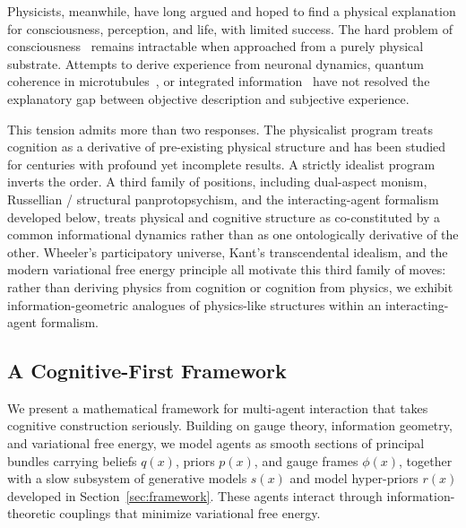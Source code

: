 \documentclass[11pt]{article}
\begin{document}
Physicists, meanwhile, have long argued and hoped to find a physical explanation for consciousness, perception, and life, with limited success. The hard problem of consciousness~\cite{Chalmers1995} remains intractable when approached from a purely physical substrate. Attempts to derive experience from neuronal dynamics, quantum coherence in microtubules~\cite{HameroffPenrose1996}, or integrated information~\cite{Tononi2008} have not resolved the explanatory gap between objective description and subjective experience.

This tension admits more than two responses. The physicalist program treats cognition as a derivative of pre-existing physical structure and has been studied for centuries with profound yet incomplete results. A strictly idealist program inverts the order. A third family of positions, including dual-aspect monism, Russellian / structural panprotopsychism, and the interacting-agent formalism developed below, treats physical and cognitive structure as co-constituted by a common informational dynamics rather than as one ontologically derivative of the other. Wheeler's participatory universe, Kant's transcendental idealism, and the modern variational free energy principle all motivate this third family of moves: rather than deriving physics from cognition or cognition from physics, we exhibit information-geometric analogues of physics-like structures within an interacting-agent formalism.

\subsection{A Cognitive-First Framework}
\label{sec:cognitive_first}

We present a mathematical framework for multi-agent interaction that takes cognitive construction seriously. Building on gauge theory, information geometry, and variational free energy, we model agents as smooth sections of principal bundles carrying beliefs $q(x)$, priors $p(x)$, and gauge frames $\phi(x)$, together with a slow subsystem of generative models $s(x)$ and model hyper-priors $r(x)$ developed in Section~\ref{sec:framework}. These agents interact through information-theoretic couplings that minimize variational free energy.
\end{document}
